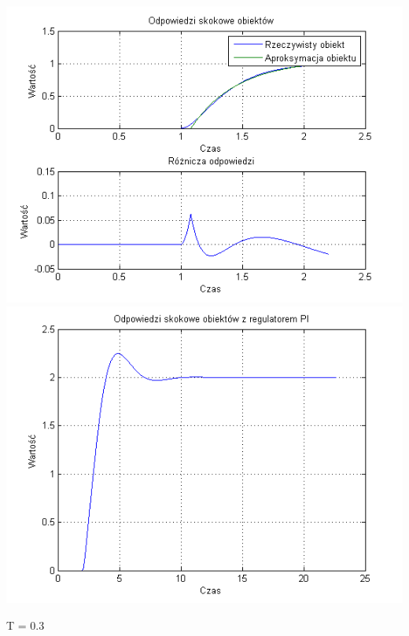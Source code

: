 \documentclass[10pt,a4paper]{article}
\begin{document}
\begin{center}
\includegraphics[scale=1]{images/jeden/skrypt_51.png}\\
\includegraphics[scale=1]{images/jeden/skrypt_52.png}\\
\end{center}
\newpage
T = 0.3
\end{document}
